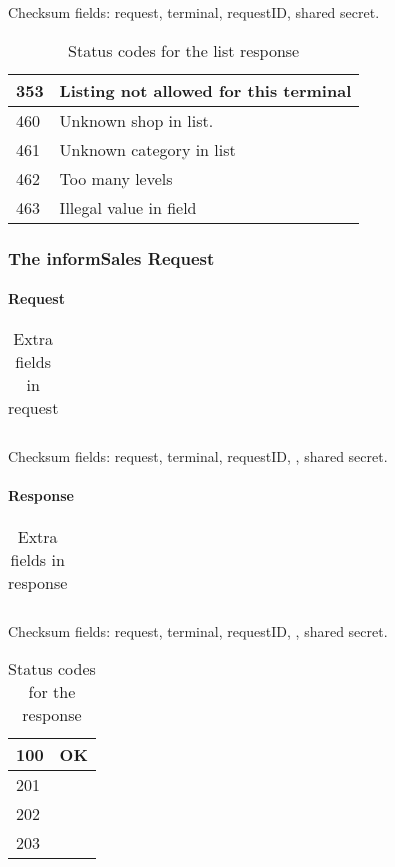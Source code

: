 \documentclass[a4paper,11pt]{article}
\newcommand{\code}[1]
   {\textsf{\mbox{#1}}}
\newcommand{\rightcellwidth}{25em}
\newcommand{\reqsection}[1]
    {\subsubsection{The \code{#1} Request}}
\newcommand{\partsection}[1]
           {\paragraph{#1}}
\begin{document}
Checksum fields: request, terminal, requestID, shared secret.

\begin{table}[!ht]
  \begin{tabular}{|l|p{\rightcellwidth}|}
    \hline
      353  & Listing not allowed for this terminal \\\hline
      460  & Unknown shop in list.\\\hline
      461  & Unknown category in list\\\hline
      462  & Too many levels\\\hline
      463  & Illegal value in field\\\hline
  \end{tabular} 
  \caption{Status codes for the \code{list} response}
\end{table}


\reqsection{informSales}

\partsection{Request}
\begin{table}[!ht]
  \begin{tabular}{|l|p{\rightcellwidth}|}
    \hline
       \\\hline
  \end{tabular} 
  \caption{Extra fields in \code{} request}
\end{table}

Checksum fields: request, terminal, requestID, , shared secret.

\partsection{Response}
\begin{table}[!ht]
  \begin{tabular}{|l|p{\rightcellwidth}|}
    \hline
       \\\hline
  \end{tabular} 
  \caption{Extra fields in \code{} response}
\end{table}

Checksum fields: request, terminal, requestID, , shared secret.

\begin{table}[!ht]
  \begin{tabular}{|l|p{\rightcellwidth}|}
    \hline
      100  & OK \\\hline
      201  & \\\hline
      202  & \\\hline
      203  & \\\hline
  \end{tabular} 
  \caption{Status codes for the \code{} response}
\end{table}
\end{document}
